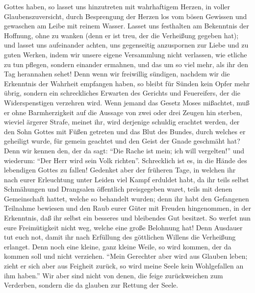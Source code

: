 Gottes haben,  so lasset uns hinzutreten mit wahrhaftigem
Herzen, in voller Glaubenszuversicht, durch Besprengung der Herzen los
vom bösen Gewissen und gewaschen am Leibe mit reinem Wasser.
 Lasset uns festhalten am Bekenntnis der Hoffnung, ohne
zu wanken (denn er ist treu, der die Verheißung gegeben hat);
 und lasset uns aufeinander achten, uns gegenseitig
anzuspornen zur Liebe und zu guten Werken,  indem wir
unsere eigene Versammlung nicht verlassen, wie etliche zu tun pflegen,
sondern einander ermahnen, und das um so viel mehr, als ihr den Tag
herannahen sehet!  Denn wenn wir freiwillig sündigen,
nachdem wir die Erkenntnis der Wahrheit empfangen haben, so bleibt für
Sünden kein Opfer mehr übrig,  sondern ein schreckliches
Erwarten des Gerichts und Feuereifers, der die Widerspenstigen verzehren
wird.  Wenn jemand das Gesetz Moses mißachtet, muß er
ohne Barmherzigkeit auf die Aussage von zwei oder drei Zeugen hin
sterben,  wieviel ärgerer Strafe, meinet ihr, wird
derjenige schuldig erachtet werden, der den Sohn Gottes mit Füßen
getreten und das Blut des Bundes, durch welches er geheiligt wurde, für
gemein geachtet und den Geist der Gnade geschmäht hat? 
Denn wir kennen den, der da sagt: ``Die Rache ist mein; ich will
vergelten!'' und wiederum: ``Der Herr wird sein Volk richten''.
 Schrecklich ist es, in die Hände des lebendigen Gottes
zu fallen!  Gedenket aber der früheren Tage, in welchen
ihr nach eurer Erleuchtung unter Leiden viel Kampf erduldet habt,
 da ihr teils selbst Schmähungen und Drangsalen
öffentlich preisgegeben waret, teils mit denen Gemeinschaft hattet,
welche so behandelt wurden;  denn ihr habt den Gefangenen
Teilnahme bewiesen und den Raub eurer Güter mit Freuden hingenommen, in
der Erkenntnis, daß ihr selbst ein besseres und bleibendes Gut besitzet.
 So werfet nun eure Freimütigkeit nicht weg, welche eine
große Belohnung hat!  Denn Ausdauer tut euch not, damit
ihr nach Erfüllung des göttlichen Willens die Verheißung erlanget.
 Denn noch eine kleine, ganz kleine Weile, so wird
kommen, der da kommen soll und nicht verziehen.  ``Mein
Gerechter aber wird aus Glauben leben; zieht er sich aber aus Feigheit
zurück, so wird meine Seele kein Wohlgefallen an ihm haben.''
 Wir aber sind nicht von denen, die feige zurückweichen
zum Verderben, sondern die da glauben zur Rettung der Seele.

